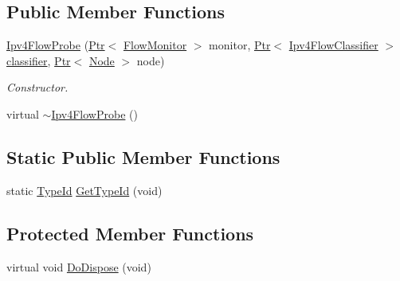 \subsection*{Public Member Functions}
\begin{DoxyCompactItemize}
\item 
\hyperlink{classns3_1_1Ipv4FlowProbe_ac22ef10899500d98945fc8140fab1cb4}{Ipv4\+Flow\+Probe} (\hyperlink{classns3_1_1Ptr}{Ptr}$<$ \hyperlink{classns3_1_1FlowMonitor}{Flow\+Monitor} $>$ monitor, \hyperlink{classns3_1_1Ptr}{Ptr}$<$ \hyperlink{classns3_1_1Ipv4FlowClassifier}{Ipv4\+Flow\+Classifier} $>$ \hyperlink{design_8txt_af9e6b398b148789960232a87c72a107e}{classifier}, \hyperlink{classns3_1_1Ptr}{Ptr}$<$ \hyperlink{classns3_1_1Node}{Node} $>$ node)
\begin{DoxyCompactList}\small\item\em Constructor. \end{DoxyCompactList}\item 
virtual \hyperlink{classns3_1_1Ipv4FlowProbe_a8e784aef14c48ab4f5dd309c973440d1}{$\sim$\+Ipv4\+Flow\+Probe} ()
\end{DoxyCompactItemize}
\subsection*{Static Public Member Functions}
\begin{DoxyCompactItemize}
\item 
static \hyperlink{classns3_1_1TypeId}{Type\+Id} \hyperlink{classns3_1_1Ipv4FlowProbe_a3f4be32333ce5e20e22db10cafd98446}{Get\+Type\+Id} (void)
\end{DoxyCompactItemize}
\subsection*{Protected Member Functions}
\begin{DoxyCompactItemize}
\item 
virtual void \hyperlink{classns3_1_1Ipv4FlowProbe_ae8bcb5588329db049f1c04191fec4d70}{Do\+Dispose} (void)
\end{DoxyCompactItemize}
